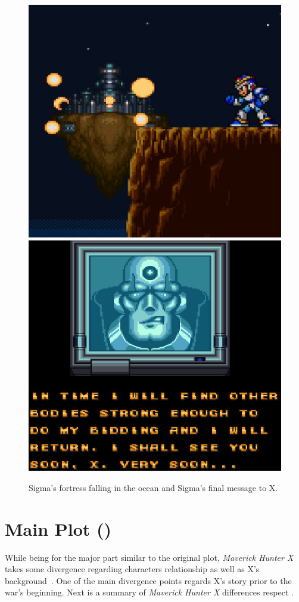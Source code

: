 \begin{figure}[htp]
	\centering
	\includegraphics[width=0.45\linewidth]{figures/X1/Ending.jpg}
	\includegraphics[width=0.45\linewidth]{figures/X1/sigma_message.jpg}
	\caption{Sigma's fortress falling in the ocean and Sigma's final message to X.}
\end{figure}

\section{Main Plot (\mhx)}
While being for the major part similar to the original plot, \textit{Maverick Hunter X} takes some divergence regarding characters relationship as well as X's background~\cite{wiki:MM_MHX}. One of the main divergence points regards X's story prior to the war's beginning. Next is a summary of \textit{Maverick Hunter X} differences respect \x.

